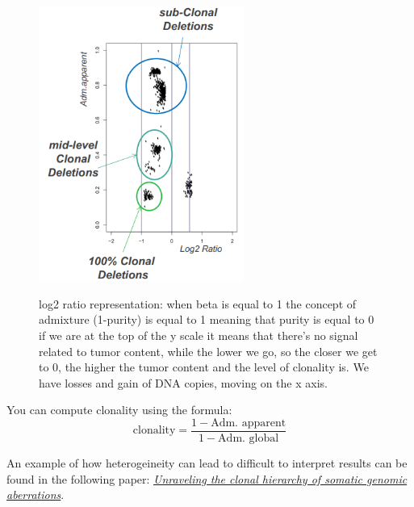   \begin{figure}[ht]
    \caption{log2 ratio representation: when beta is equal
    to 1 the concept of admixture (1-purity) is equal to 1 meaning that purity is
    equal to 0 if we are at the top of the y scale it means that there's no signal
    related to tumor content, while the lower we go, so the closer we get to 0, the
    higher the tumor content and the level of clonality is. We have losses and
    gain of DNA copies, moving on the x axis.}
    \centering
    \includegraphics[width=0.6\textwidth]{image_04.png}
    \label{fig: log2 plot}
  \end{figure}
  
  You can compute clonality using the formula:
  $$
  \text{clonality} = \frac{1 - \text{Adm. apparent}}{1 - \text{Adm. global}}
  $$

  An example of how heterogeineity can lead to difficult to interpret results
  can be found in the following paper:
  \href{https://pubmed.ncbi.nlm.nih.gov/25160065/}{\textit{Unraveling the clonal
  hierarchy of somatic genomic aberrations}}. \\


